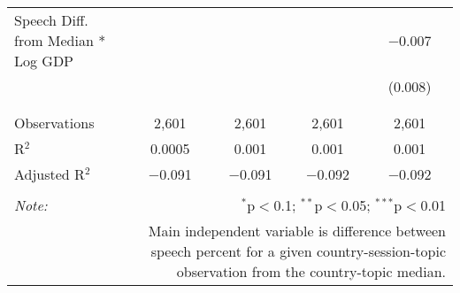 \begin{table}[!htbp]
\begin{tabular}{@{\extracolsep{5pt}}lcccc}
 Speech Diff. from Median * Log GDP &  &  &  & $-$0.007 \\ 
  &  &  &  & (0.008) \\ 
  & & & & \\ 
\hline \\[-1.8ex] 
Observations & 2,601 & 2,601 & 2,601 & 2,601 \\ 
R$^{2}$ & 0.0005 & 0.001 & 0.001 & 0.001 \\ 
Adjusted R$^{2}$ & $-$0.091 & $-$0.091 & $-$0.092 & $-$0.092 \\ 
\hline 
\hline \\[-1.8ex] 
\textit{Note:}  & \multicolumn{4}{r}{$^{*}$p$<$0.1; $^{**}$p$<$0.05; $^{***}$p$<$0.01} \\ 
 & \multicolumn{4}{r}{Main independent variable is difference between speech percent for a given country-session-topic observation from the country-topic median.} \\ 
\end{tabular} 
\end{table} 
